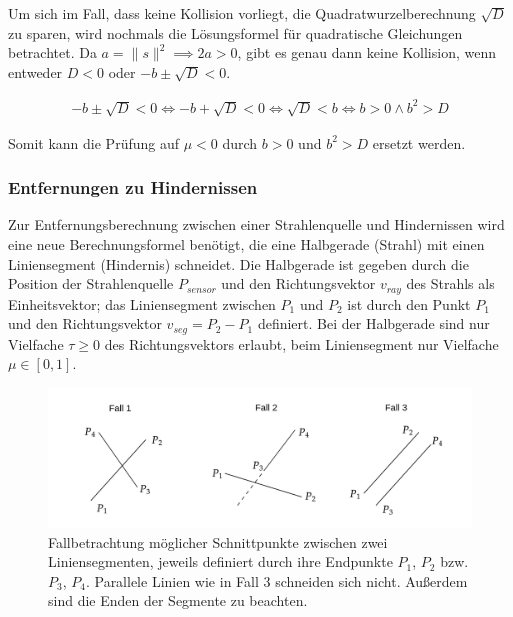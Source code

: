 Um sich im Fall, dass keine Kollision vorliegt, die Quadratwurzelberechnung
$\sqrt{D}$ zu sparen, wird nochmals die Lösungsformel für quadratische Gleichungen
betrachtet. Da $a = \lVert s \rVert^2 \implies 2a > 0$, gibt es genau dann keine Kollision,
wenn entweder $D < 0$ oder $-b \pm \sqrt{D} < 0$.

\begin{equation}
\begin{aligned}
-b \pm \sqrt{D} < 0 \iff -b + \sqrt{D} < 0 \iff \sqrt{D} < b \iff b > 0 \land b^2 > D
\end{aligned}
\end{equation}

Somit kann die Prüfung auf $\mu < 0$ durch $b > 0$ und $b^2 > D$ ersetzt werden.

\subsubsection{Entfernungen zu Hindernissen}
Zur Entfernungsberechnung zwischen einer Strahlenquelle und Hindernissen wird
eine neue Berechnungsformel benötigt, die eine Halbgerade (Strahl) mit einen
Liniensegment (Hindernis) schneidet.
Die Halbgerade ist gegeben durch die Position der Strahlenquelle $P_{sensor}$ und
den Richtungsvektor $v_{ray}$ des Strahls als Einheitsvektor; das Liniensegment zwischen
$P_1$ und $P_2$ ist durch den Punkt $P_1$ und den Richtungsvektor $v_{seg} = P_2 - P_1$
definiert. Bei der Halbgerade sind nur Vielfache $\tau \ge 0$ des Richtungsvektors
erlaubt, beim Liniensegment nur Vielfache $\mu \in [0, 1]$.\\

\begin{figure}[h]
  \centering
  \includegraphics[width = 1.0\textwidth]{imgs/lineseg_intersections}
  \caption{Fallbetrachtung möglicher Schnittpunkte zwischen zwei Liniensegmenten,
  jeweils definiert durch ihre Endpunkte $P_1$, $P_2$ bzw. $P_3$, $P_4$.
  Parallele Linien wie in Fall 3 schneiden sich nicht. Außerdem sind die
  Enden der Segmente zu beachten.}
  \label{fig:linseg_intersect}
\end{figure}

